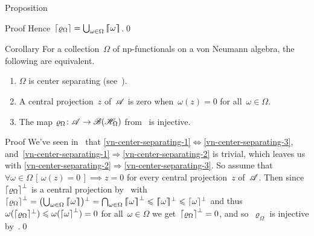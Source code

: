 \documentclass[a]{subfiles}
\begin{document}
\begin{parsec}
\begin{point}{Proposition}
\begin{point}{Proof}
Hence~$\left\lceil\varrho_\Omega\right\rceil=\bigcup_{\omega\in\Omega}\left\lceil\!\!\left\lceil\omega\right\rceil\!\!\right\rceil$.\qed
\end{point}
\end{point}
\begin{point}{Corollary}%
For a collection~$\Omega$ of np-functionals
on a von Neumann algebra,
the following are equivalent.
\begin{enumerate}
\item
\label{vn-center-separating-1}
$\Omega$ is center separating (see~).
\item
\label{vn-center-separating-2}
A central projection~$z$ of~$\mathscr{A}$ is zero
when~$\omega(z)=0$ for all~$\omega\in\Omega$.
\item
\label{vn-center-separating-3}
The map $\varrho_\Omega\colon\mathscr{A}\to\mathscr{B}(\mathscr{H}_\Omega)$
from~ 
is injective.
\end{enumerate}
\begin{point}{Proof}%
We've seen in~
that
\ref{vn-center-separating-1}$\iff$\ref{vn-center-separating-3},
and~\ref{vn-center-separating-1}$\Rightarrow$\ref{vn-center-separating-2}
is trivial,
which leaves us with 
\ref{vn-center-separating-2}$\Rightarrow$\ref{vn-center-separating-3}.
So assume that~$\forall \omega\in\Omega\,[\,\omega(z)=0\,]\implies z=0$ 
for every central projection~$z$
of~$\mathscr{A}$.
Then since~$\left\lceil\varrho_\Omega\right\rceil^\perp$
is a central projection
by~
with
$\ceil{\varrho_\Omega}^\perp
=\smash{\bigl(\bigcup_{\omega\in\Omega} \smash{\cceil{\omega}\bigr)}}^\perp
=\bigcap_{\omega\in \Omega} \cceil{\omega}^\perp
\leq \smash{\cceil{\omega}}^\perp
\leq \smash{\ceil{\omega}}^\perp$
and thus
$\omega(\smash{\left\lceil\varrho_\Omega\right\rceil}^\perp)
\leqslant \omega(\left\lceil\omega\right\rceil^\perp)=0$
for all~$\omega\in\Omega$
we get~$\left\lceil\varrho_\Omega\right\rceil^\perp =0$,
and so~$\varrho_\Omega$ is injective
by~.\qed
\end{point}
\end{point}
\end{parsec}
\end{document}

